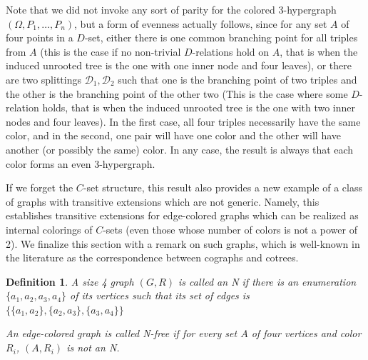 \documentclass{amsart}
\newtheorem{definition}[theorem]{Definition}
\newcommand{\set}[1]{\{#1 \}}
\begin{document}
Note that we did not invoke any sort of parity for the colored 3-hypergraph $(\Omega, P_1, \dots, P_n)$, but a form of evenness actually follows, since for any set $A$ of four points in a $D$-set, either there is one common branching point for all triples from $A$ (this is the case if no non-trivial $D$-relations hold on $A$, that is when the induced unrooted tree is the one with one inner node and four leaves), or there are two splittings $\mathcal{D}_1, \mathcal{D}_2$ such that one is the branching point of two triples and the other is the branching point of the other two (This is the case where some $D$-relation holds, that is when the induced unrooted tree is the one with two inner nodes and four leaves). In the first case, all four triples necessarily have the same color, and in the second, one pair will have one color and the other will have another (or possibly the same) color. In any case, the result is always that each color forms an even 3-hypergraph.

If we forget the $C$-set structure, this result also provides a new example of a class of graphs with transitive extensions which are not generic. Namely, this establishes transitive extensions for edge-colored graphs which can be realized as internal colorings of $C$-sets (even those whose number of colors is not a power of 2). We finalize this section with a remark on such graphs, which is well-known in the literature as the correspondence between cographs and cotrees.

\begin{definition}
    A size 4 graph $(G, R)$ is called an \emph{N} if there is an enumeration $\set{a_1, a_2, a_3, a_4}$ of its vertices such that its set of edges is $\set{\set{a_1,a_2}, \set{a_2,a_3}, \set{a_3,a_4}}$
    
    An edge-colored graph is called \emph{N-free} if for every set $A$ of four vertices and color $R_i$, $(A, R_i)$ is not an N.
\end{definition}
\end{document}
